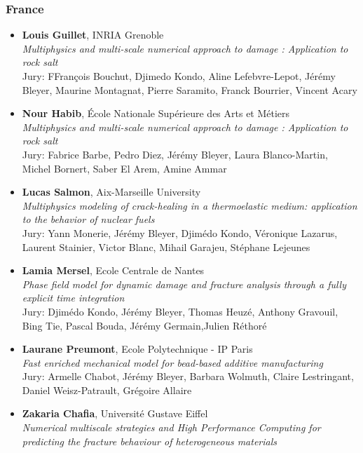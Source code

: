 \subsubsection*{France}
\begin{itemize}[noitemsep]
\item[2026] \textbf{Louis Guillet}, INRIA Grenoble\\
\textit{Multiphysics and multi-scale numerical approach to damage :
Application to rock salt}\\
Jury: FFrançois Bouchut, Djimedo Kondo, Aline Lefebvre-Lepot, Jérémy Bleyer, Maurine Montagnat, Pierre Saramito, Franck Bourrier, Vincent Acary
\item[2025] \textbf{Nour Habib}, \'Ecole Nationale Supérieure des Arts et Métiers\\
\textit{Multiphysics and multi-scale numerical approach to damage :
Application to rock salt}\\
Jury: Fabrice Barbe, Pedro Diez, Jérémy Bleyer, Laura Blanco-Martin, Michel Bornert, Saber El Arem, Amine Ammar
\item[2025] \textbf{Lucas Salmon}, Aix-Marseille University\\
\textit{Multiphysics modeling of crack-healing in a thermoelastic medium: application to the behavior of nuclear fuels}\\
Jury: Yann Monerie, Jérémy Bleyer, Djimédo Kondo, Véronique Lazarus, Laurent Stainier, Victor Blanc, Mihail Garajeu, Stéphane Lejeunes
\item[2025] \textbf{Lamia Mersel}, Ecole Centrale de Nantes\\
\textit{Phase field model for dynamic damage and fracture analysis through a fully explicit time integration}\\
Jury: Djimédo Kondo, Jérémy Bleyer, Thomas Heuzé, Anthony Gravouil, Bing Tie, Pascal Bouda, Jérémy Germain,Julien Réthoré
\item[2025] \textbf{Laurane Preumont}, Ecole Polytechnique - IP Paris\\
\textit{Fast enriched mechanical model for bead-based additive manufacturing}\\
Jury: Armelle Chabot, Jérémy Bleyer, Barbara Wolmuth, Claire Lestringant, Daniel Weisz-Patrault, Grégoire Allaire
\item[2024] \textbf{Zakaria Chafia}, Université Gustave Eiffel\\
\textit{Numerical multiscale strategies and High Performance Computing for predicting the fracture behaviour of heterogeneous materials}\\

\end{itemize}
